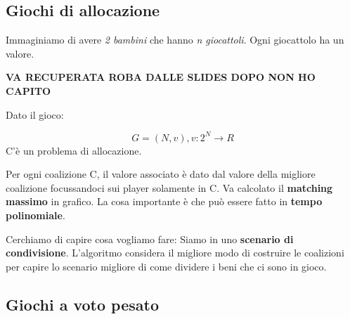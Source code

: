 \begin{figure}[H]
    \begin{center}
    \end{center}
\end{figure}

\subsection{Giochi di allocazione}
\label{Giochi di allocazione}

Immaginiamo di avere \textit{2 bambini} che hanno \textit{n giocattoli}. Ogni
giocattolo ha un valore.

\textbf{VA RECUPERATA ROBA DALLE SLIDES DOPO NON HO CAPITO}

Dato il gioco:

\[ G = (N,v), v:2^N \rightarrow R\]
C'è un problema di allocazione.

Per ogni coalizione C, il valore associato è dato dal valore della migliore
coalizione focussandoci sui player solamente in C. Va calcolato il
\textbf{matching massimo} in grafico. La cosa importante è che può essere fatto
in \textbf{tempo polinomiale}.

Cerchiamo di capire cosa vogliamo fare: Siamo in uno \textbf{scenario di
    condivisione}. L'algoritmo considera il migliore modo di costruire le
coalizioni per capire lo scenario migliore di come dividere i beni che ci sono
in gioco.

\subsection{Giochi a voto pesato}

